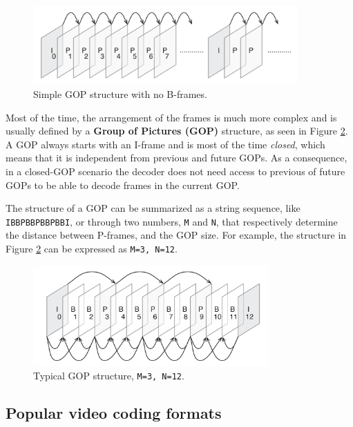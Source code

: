 \begin{figure}
	\centering
	
	\includegraphics[width=0.9\textwidth]{res/gop1.png}
	
	\caption{Simple GOP structure with no B-frames.}
	\label{fig:codec_gop1}
\end{figure}

Most of the time, the arrangement of the frames is much more complex and is usually defined by a \textbf{Group of Pictures (GOP)} structure, as seen in Figure \ref{fig:codec_gop2}. A GOP always starts with an I-frame and is most of the time \textit{closed}, which means that it is independent from previous and future GOPs. As a consequence, in a closed-GOP scenario the decoder does not need access to previous of future GOPs to be able to decode frames in the current GOP.

The structure of a GOP can be summarized as a string sequence, like \texttt{IBBPBBPBBPBBI}, or through two numbers, \texttt{M} and \texttt{N}, that respectively determine the distance between P-frames, and the GOP size. For example, the structure in Figure \ref{fig:codec_gop2} can be expressed as \texttt{M=3, N=12}.

\begin{figure}
	\centering
	
	\includegraphics[width=0.8\textwidth]{res/gop2.png}
	
	\caption{Typical GOP structure, \texttt{M=3, N=12}.}
	\label{fig:codec_gop2}
\end{figure}

\subsection{Popular video coding formats}
\label{sec:bg/compression/codecs}

